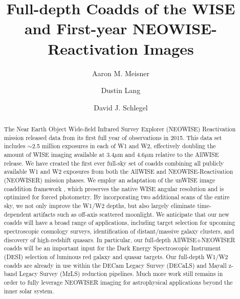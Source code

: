 \documentclass{emulateapj}
\begin{document}
 
\title{Full-depth Coadds of the WISE and First-year NEOWISE-Reactivation Images}

\author{Aaron M. Meisner}
\author{Dustin Lang}
\author{David J. Schlegel}


\begin{abstract} 
The Near Earth Object Wide-field Infrared Survey Explorer (NEOWISE)
Reactivation mission released data from its first full year of observations
in 2015. This data set includes $\sim$2.5 million exposures in each of W1 and
W2, effectively doubling the amount of WISE imaging available at 3.4$\mu$m and 
4.6$\mu$m relative to the AllWISE release. We have created the first ever 
full-sky set of coadds combining all publicly available W1 and W2 exposures 
from both the AllWISE and NEOWISE-Reactivation (NEOWISER) mission phases. We 
employ an adaptation of the unWISE image coaddition framework \citep{lang14}, 
which preserves the native WISE angular resolution and is optimized for forced 
photometry. By incorporating two additional scans of the entire sky, we not 
only improve the W1/W2 depths, but also largely eliminate time-dependent 
artifacts such as off-axis scattered moonlight. We anticipate that our new 
coadds will have a broad range of applications, including target selection for 
upcoming spectroscopic cosmology surveys, identification of distant/massive 
galaxy clusters, and discovery of high-redshift quasars. In particular, our 
full-depth AllWISE+NEOWISER coadds will be an important input for the Dark 
Energy Spectroscopic Instrument (DESI) selection of luminous red galaxy and 
quasar targets. Our full-depth W1/W2 coadds are already in use within the 
DECam Legacy Survey (DECaLS) and Mayall z-band Legacy Survey (MzLS) reduction 
pipelines. Much more work still remains in order to fully leverage NEOWISER 
imaging for astrophysical applications beyond the inner solar system.
\end{abstract}  
 
\end{document}
